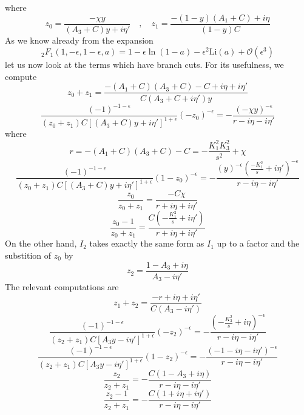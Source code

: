 where
\begin{equation}
z_0 = \frac{-\chi y}{(A_3 + C)y +i\eta'}\quad,\quad
z_1 = \frac{-(1-y)(A_1 + C)+i\eta}{(1-y)C}
\end{equation}
As we know already from the expansion
\begin{equation}
{}_2F_1(1,-\epsilon,1-\epsilon,a) = 1-\epsilon\ln(1-a) - \epsilon^2\mathrm{Li}(a) + \mathcal{O}(\epsilon^{3})
\end{equation}
let us now look at the terms which have branch cuts. 
For its usefulness, we compute
\begin{equation}
z_0 + z_1 = \frac{-(A_1 + C)(A_3 + C) - C +i\eta + i\eta'}{C(A_3 + C + i\eta')y}
\end{equation}
%
\begin{equation}
\frac{(-1)^{-1-\epsilon}}{(z_0+z_1)C[(A_3 + C )y + i\eta']^{1+\epsilon}}(-z_0)^{-\epsilon}
= -\frac{(-\chi y)^{-\epsilon}}{r - i\eta-i\eta'}
\end{equation}
where
\begin{equation}
r = -(A_1 + C)(A_3 + C)-C = -\frac{K^2_1K_3^2}{s^2} +\chi 
\end{equation}
%
\begin{equation}
\frac{(-1)^{-1-\epsilon}}{(z_0+z_1)C[(A_3 + C)y + i\eta']^{1+\epsilon}}(1-z_0)^{-\epsilon}
= - \frac{(y)^{-\epsilon}(\frac{-K_1^2}{s}+i\eta')^{-\epsilon}}{r - i\eta-i\eta'}
\end{equation}
%
\begin{equation}
\frac{z_0}{z_0 + z_1} = \frac{-C\chi }{r + i\eta + i\eta'}
\end{equation}
%
\begin{equation}
\frac{z_0 - 1}{z_0 + z_1} = \frac{C(-\frac{K_1^2}{s}+i\eta')}{r + i\eta + i\eta'}
\end{equation}
%
On the other hand, 
$I_2$ takes exactly the same form as $I_1$ up to a factor and the substition of $z_0$ by
\begin{equation}
z_2 = \frac{1-A_3 + i\eta}{A_3-i\eta'}
\end{equation}
The relevant computations are
\begin{equation}
z_1 + z_2 = \frac{-r + i\eta + i\eta'}{C(A_3 - i\eta')}
\end{equation}
%
\begin{equation}
\frac{(-1)^{-1-\epsilon}}{(z_2+z_1)C[A_3 y - i\eta']^{1+\epsilon}}(-z_2)^{-\epsilon}
= -\frac{(-\frac{K_3^2}{s} + i\eta)^{-\epsilon}}{r - i\eta-i\eta'}
\end{equation}
%
\begin{equation}
\frac{(-1)^{-1-\epsilon}}{(z_2+z_1)C[A_3y - i\eta']^{1+\epsilon}}(1-z_2)^{-\epsilon}
= - \frac{(-1-i\eta-i\eta')^{-\epsilon}}{r - i\eta-i\eta'}
\end{equation}
%
\begin{equation}
\frac{z_2}{z_2+z_1} = -\frac{C(1-A_3 + i\eta)}{r-i\eta-i\eta'}
\end{equation}
%
\begin{equation}
\frac{z_2-1}{z_2+z_1} = -\frac{C(1+i\eta+i\eta')}{r-i\eta-i\eta'}
\end{equation}
\fi


